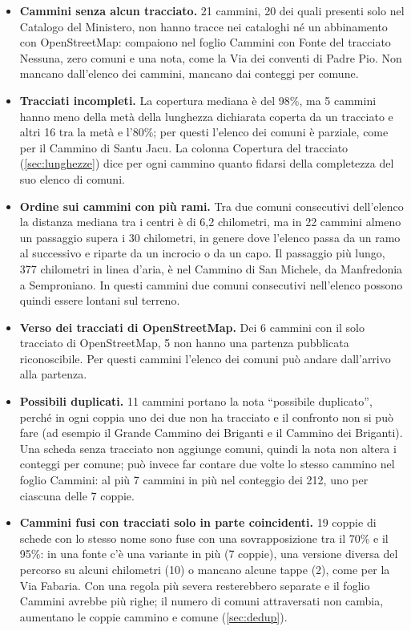 \begin{itemize}
\item \textbf{Cammini senza alcun tracciato.} 21 cammini, 20 dei quali presenti solo nel Catalogo del Ministero, non hanno tracce nei cataloghi né un abbinamento con OpenStreetMap: compaiono nel foglio Cammini con Fonte del tracciato Nessuna, zero comuni e una nota, come la Via dei conventi di Padre Pio. Non mancano dall'elenco dei cammini, mancano dai conteggi per comune.
\item \textbf{Tracciati incompleti.} La copertura mediana è del 98\%, ma 5 cammini hanno meno della metà della lunghezza dichiarata coperta da un tracciato e altri 16 tra la metà e l'80\%; per questi l'elenco dei comuni è parziale, come per il Cammino di Santu Jacu. La colonna Copertura del tracciato (\cref{sec:lunghezze}) dice per ogni cammino quanto fidarsi della completezza del suo elenco di comuni.
\item \textbf{Ordine sui cammini con più rami.} Tra due comuni consecutivi dell'elenco la distanza mediana tra i centri è di 6,2 chilometri, ma in 22 cammini almeno un passaggio supera i 30 chilometri, in genere dove l'elenco passa da un ramo al successivo e riparte da un incrocio o da un capo. Il passaggio più lungo, 377 chilometri in linea d'aria, è nel Cammino di San Michele, da Manfredonia a Semproniano. In questi cammini due comuni consecutivi nell'elenco possono quindi essere lontani sul terreno.
\item \textbf{Verso dei tracciati di OpenStreetMap.} Dei 6 cammini con il solo tracciato di OpenStreetMap, 5 non hanno una partenza pubblicata riconoscibile. Per questi cammini l'elenco dei comuni può andare dall'arrivo alla partenza.
\item \textbf{Possibili duplicati.} 11 cammini portano la nota “possibile duplicato”, perché in ogni coppia uno dei due non ha tracciato e il confronto non si può fare (ad esempio il Grande Cammino dei Briganti e il Cammino dei Briganti). Una scheda senza tracciato non aggiunge comuni, quindi la nota non altera i conteggi per comune; può invece far contare due volte lo stesso cammino nel foglio Cammini: al più 7 cammini in più nel conteggio dei 212, uno per ciascuna delle 7 coppie.
\item \textbf{Cammini fusi con tracciati solo in parte coincidenti.} 19 coppie di schede con lo stesso nome sono fuse con una sovrapposizione tra il 70\% e il 95\%: in una fonte c'è una variante in più (7 coppie), una versione diversa del percorso su alcuni chilometri (10) o mancano alcune tappe (2), come per la Via Fabaria. Con una regola più severa resterebbero separate e il foglio Cammini avrebbe più righe; il numero di comuni attraversati non cambia, aumentano le coppie cammino e comune (\cref{sec:dedup}).

\end{itemize}

